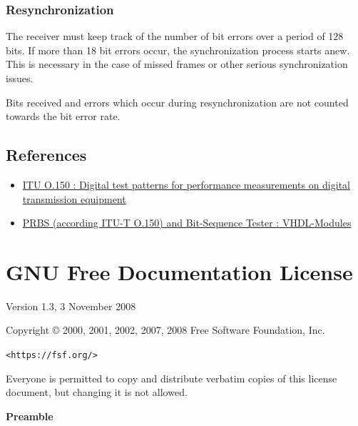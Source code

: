 \documentclass[a4paper,11pt,oneside]{book}
\begin{document}
\subsection{Resynchronization}

The receiver must keep track of the number of bit errors over a period of 128 bits. If more than 18 bit errors occur, the synchronization process starts anew. This is necessary in the case of missed frames or other serious synchronization issues.

Bits received and errors which occur during resynchronization are not counted towards the bit error rate.

\section{References}

\begin{itemize}
	\item
	\href{http://www.itu.int/rec/T-REC-O.150-199210-S}{ITU O.150 : Digital 	test patterns for performance measurements on digital transmission 	equipment}
	\item
	\href{http://www.pldworld.com/_hdl/5/-thorsten-gaertner.de/vhdl/PRBS.pdf}{PRBS
	(according ITU-T O.150) and Bit-Sequence Tester : VHDL-Modules}
\end{itemize}

\chapter{GNU Free Documentation License}

\begin{center}

	Version 1.3, 3 November 2008


	Copyright \copyright{} 2000, 2001, 2002, 2007, 2008  Free Software Foundation, Inc.

	\bigskip

	\texttt{<https://fsf.org/>}

	\bigskip

	Everyone is permitted to copy and distribute verbatim copies
	of this license document, but changing it is not allowed.
\end{center}


\begin{center}
	{\bf\large Preamble}
\end{center}
\end{document}
